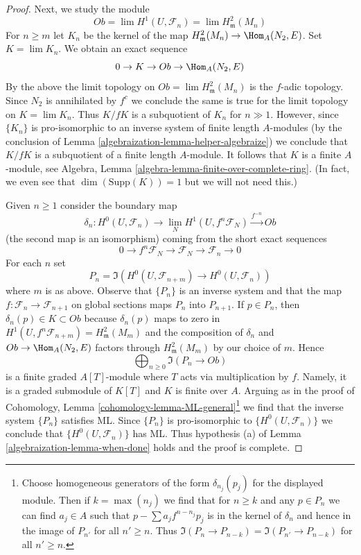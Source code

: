 \begin{proof}
\medskip\noindent
Next, we study the module
$$
Ob = \lim H^1(U, \mathcal{F}_n) = \lim H^2_\mathfrak m(M_n)
$$
For $n \geq m$ let $K_n$ be the kernel of the map
$H^2_\mathfrak m(M_n) \to \Hom_A(N_2, E)$.
Set $K = \lim K_n$. We obtain an exact sequence
$$
0 \to K \to Ob \to \Hom_A(N_2, E)
$$
By the above the limit topology on $Ob = \lim H^2_\mathfrak m(M_n)$
is the $f$-adic topology. Since $N_2$ is annihilated by $f^c$
we conclude the same is true for the limit topology on $K = \lim K_n$.
Thus $K/fK$ is a subquotient of $K_n$ for $n \gg 1$.
However, since $\{K_n\}$ is pro-isomorphic to an inverse system of
finite length $A$-modules (by the conclusion of
Lemma \ref{algebraization-lemma-helper-algebraize})
we conclude that $K/fK$ is a subquotient of a finite length
$A$-module. It follows that $K$ is a finite $A$-module, see
Algebra, Lemma \ref{algebra-lemma-finite-over-complete-ring}.
(In fact, we even see that $\dim(\text{Supp}(K)) = 1$ but
we will not need this.)

\medskip\noindent
Given $n \geq 1$ consider the boundary map
$$
\delta_n :
H^0(U, \mathcal{F}_n)
\longrightarrow
\lim_N H^1(U, f^n\mathcal{F}_N) \xrightarrow{f^{-n}} Ob
$$
(the second map is an isomorphism)
coming from the short exact sequences
$$
0 \to f^n\mathcal{F}_N \to \mathcal{F}_N \to \mathcal{F}_n \to 0
$$
For each $n$ set
$$
P_n = \Im(H^0(U, \mathcal{F}_{n + m}) \to H^0(U, \mathcal{F}_n))
$$
where $m$ is as above. Observe that $\{P_n\}$ is an inverse
system and that the map $f : \mathcal{F}_n \to \mathcal{F}_{n + 1}$
on global sections maps $P_n$ into $P_{n + 1}$.
If $p \in P_n$, then $\delta_n(p) \in K \subset Ob$
because $\delta_n(p)$ maps to zero in
$H^1(U, f^n\mathcal{F}_{n + m}) = H^2_\mathfrak m(M_m)$
and the composition of $\delta_n$ and $Ob \to \Hom_A(N_2, E)$
factors through $H^2_\mathfrak m(M_m)$ by our choice of $m$.
Hence
$$
\bigoplus\nolimits_{n \geq 0} \Im(P_n \to Ob)
$$
is a finite graded $A[T]$-module where $T$ acts via multiplication by $f$.
Namely, it is a graded submodule of $K[T]$ and $K$ is finite over $A$.
Arguing as in the proof of
Cohomology, Lemma \ref{cohomology-lemma-ML-general}\footnote{Choose
homogeneous generators of the form $\delta_{n_j}(p_j)$ for the displayed
module. Then if $k = \max(n_j)$ we find that for $n \geq k$
and any $p \in P_n$ we can find $a_j \in A$ such that
$p - \sum a_j f^{n - n_j} p_j$ is in the kernel of $\delta_n$
and hence in the image of $P_{n'}$ for all $n' \geq n$.
Thus $\Im(P_n \to P_{n - k}) = \Im(P_{n'} \to P_{n - k})$
for all $n' \geq n$.}
we find that the inverse system $\{P_n\}$ satisfies ML.
Since $\{P_n\}$ is pro-isomorphic to $\{H^0(U, \mathcal{F}_n)\}$
we conclude that $\{H^0(U, \mathcal{F}_n)\}$ has ML.
Thus hypothesis (a) of Lemma \ref{algebraization-lemma-when-done}
holds and the proof is complete.
\end{proof}

